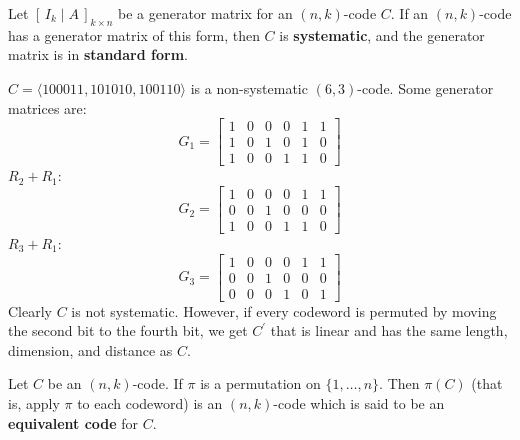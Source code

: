 \begin{defbox}
    \begin{definition}
        Let $ \left[\, I_k\mid A \,\right]_{k\times n} $ be a generator matrix
        for an $ (n,k) $-code $ C $. If an $ (n,k) $-code has a generator
        matrix of this form, then $ C $ is \textbf{systematic}, and the generator
        matrix is in \textbf{standard form}.
    \end{definition} \end{defbox}

\begin{exbox}
    \begin{example}
    $ C=\langle 100011,101010,100110\rangle $
    is a non-systematic $ (6,3) $-code.
    Some generator matrices are:
    \[ G_1=\left[
            \begin{array}{ccc|ccc}
                1 & 0 & 0 & 0 & 1 & 1 \\
                1 & 0 & 1 & 0 & 1 & 0 \\
                1 & 0 & 0 & 1 & 1 & 0
            \end{array} \right] \]
    $ R_2+R_1 $:
    \[ G_2= \left[
            \begin{array}{ccc|ccc}
                1 & 0 & 0 & 0 & 1 & 1 \\
                0 & 0 & 1 & 0 & 0 & 0 \\
                1 & 0 & 0 & 1 & 1 & 0
            \end{array} \right] \]
    $ R_3+R_1 $:
    \[ G_3=\left[
            \begin{array}{ccc|ccc}
                1 & 0 & 0 & 0 & 1 & 1 \\
                0 & 0 & 1 & 0 & 0 & 0 \\
                0 & 0 & 0 & 1 & 0 & 1
            \end{array} \right] \]
    Clearly $ C $ is not systematic. However, if every codeword
    is permuted by moving the second bit to the fourth bit, we get $ C^{\prime} $
    that is linear and has the same length, dimension, and distance as $ C $.
\end{example}
\end{exbox}

\begin{defbox}
    \begin{definition}
        Let $ C $ be an $ (n,k) $-code. If $ \pi $ is a permutation on
        $ \{1,\ldots ,n\} $. Then $ \pi(C) $ (that is, apply $ \pi $ to each
        codeword) is an $ (n,k) $-code which is said to be an \textbf{equivalent code}
        for $ C $.
    \end{definition} \end{defbox}

